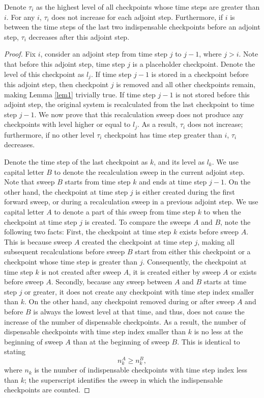 \begin{lemma} \label{lem1}
    Denote $\tau_i$ as the highest level of all checkpoints whose time steps
    are greater than $i$.  For any $i$, $\tau_i$ does not increase for each
    adjoint step.  Furthermore, if $i$ is between the time steps of the last
    two indispensable checkpoints before an adjoint step, $\tau_i$ decreases
    after this adjoint step.
\end{lemma}
\begin{proof}
    Fix $i$, consider an adjoint step from time step $j$ to $j - 1$, where
    $j > i$.  Note that before this adjoint step, time step $j$ is a
    placeholder checkpoint.  Denote the level of this checkpoint as $l_j$.
    If time step $j - 1$ is stored in a checkpoint before this adjoint
    step, then checkpoint $j$ is removed and all other checkpoints remain,
    making Lemma \ref{lem1} trivially true.  If time step $j - 1$ is not stored
    before this adjoint step, the original system is recalculated from
    the last checkpoint to time step $j - 1$.  We now prove that this
    recalculation sweep does not produce any checkpoints with level higher or
    equal to $l_j$.  As a result, $\tau_i$ does not increase; furthermore, if
    no other level $\tau_i$ checkpoint has time step greater than $i$, $\tau_i$
    decreases.

    Denote the time step of the last checkpoint as $k$, and its level as $l_k$.
    We use capital letter $B$ to denote the recalculation sweep in the current
    adjoint step.  Note that sweep $B$ starts from time step $k$ and ends at
    time step $j - 1$.  On the other hand, the checkpoint at time step $j$ is
    either created during the first forward sweep, or during a recalculation
    sweep in a previous adjoint step.  We use capital letter $A$ to denote a
    part of this sweep from time step $k$ to when the checkpoint at time step
    $j$ is created.  To compare the sweeps $A$ and $B$, note the following
    two facts:
    First, the checkpoint at time step $k$ exists before sweep $A$.  This is
    because sweep $A$ created the checkpoint at time step $j$, making all
    subsequent recalculations before sweep $B$ start from either this
    checkpoint or a checkpoint whose time step is greater than $j$.
    Consequently, the checkpoint at time step $k$ is not created after sweep
    $A$, it is created either by sweep $A$ or exists before sweep $A$.
    Secondly, because any sweep between $A$ and $B$ starts at time step $j$
    or greater, it does not create any checkpoint with time step index smaller
    than $k$.  On the other hand, any checkpoint removed during or after sweep
    $A$ and before $B$ is always the lowest level at that time, and thus, does
    not cause the increase of the number of dispensable checkpoints.  As a
    result, the number of dispensable checkpoints with time step index smaller
    than $k$ is no less at the beginning of sweep $A$ than at the beginning of
    sweep $B$.  This is identical to stating
    $$ n_k^{A} \ge n_k^{B}, $$
    where $n_k$ is the number of indispensable checkpoints with time step index
    less than $k$; the superscript identifies the sweep in which the
    indispensable checkpoints are counted.


\end{proof}
